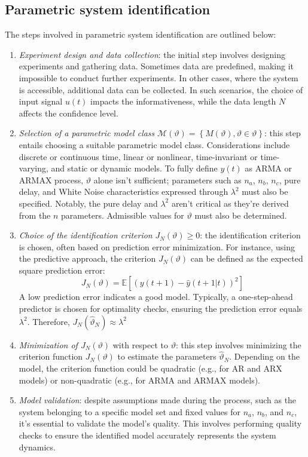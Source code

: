 \subsection{Parametric system identification}
The steps involved in parametric system identification are outlined below:
\begin{enumerate} 
    \item \textit{Experiment design and data collection}: the initial step involves designing experiments and gathering data. 
        Sometimes data are predefined, making it impossible to conduct further experiments. 
        In other cases, where the system is accessible, additional data can be collected. 
        In such scenarios, the choice of input signal $u(t)$ impacts the informativeness, while the data length $N$ affects the confidence level.
    \item \textit{Selection of a parametric model class} $\mathcal{M}(\vartheta)=\left\{ M(\vartheta),\vartheta \in \vartheta\right\}$: this step entails choosing a suitable parametric model class.
        Considerations include discrete or continuous time, linear or nonlinear, time-invariant or time-varying, and static or dynamic models. 
        To fully define $y(t)$ as ARMA or ARMAX process, $\vartheta$ alone isn't sufficient; parameters such as $n_a$, $n_b$, $n_c$, pure delay, and White Noise characteristics expressed through $\lambda^2$ must also be specified.
        Notably, the pure delay and $\lambda^2$ aren't critical as they're derived from the $n$ parameters.
        Admissible values for $\vartheta$ must also be determined.
    \item \textit{Choice of the identification criterion} $J_N(\vartheta)\geq 0$: the identification criterion is chosen, often based on prediction error minimization. 
        For instance, using the predictive approach, the criterion $J_N(\vartheta)$ can be defined as the expected square prediction error:
        \[J_N(\vartheta)=\mathbb{E}\left[ \left(y(t+1)-\hat{y}(t+1|t)\right)^2 \right]\]
        A low prediction error indicates a good model.
        Typically, a one-step-ahead predictor is chosen for optimality checks, ensuring the prediction error equals $\lambda^2$.
        Therefore, $J_N(\hat{\vartheta}_N) \approx \lambda^2$
    \item \textit{Minimization of $J_N(\vartheta)$} with respect to $\vartheta$: this step involves minimizing the criterion function $J_N(\vartheta)$ to estimate the parameters $\hat{\vartheta}_N$.
        Depending on the model, the criterion function could be quadratic (e.g., for AR and ARX models) or non-quadratic (e.g., for ARMA and ARMAX models).
    \item \textit{Model validation}: despite assumptions made during the process, such as the system belonging to a specific model set and fixed values for $n_a$, $n_b$, and $n_c$, it's essential to validate the model's quality. 
        This involves performing quality checks to ensure the identified model accurately represents the system dynamics.
\end{enumerate}